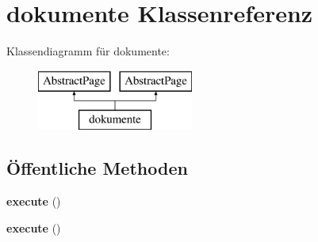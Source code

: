 \hypertarget{classdokumente}{}\section{dokumente Klassenreferenz}
\label{classdokumente}
Klassendiagramm für dokumente\+:\begin{figure}[H]
\begin{center}
\leavevmode
\includegraphics[height=2.000000cm]{classdokumente}
\end{center}
\end{figure}
\subsection*{Öffentliche Methoden}
\begin{DoxyCompactItemize}
\item 
\mbox{\label{classdokumente_aebf9dcf4eb2489342b2d286fc3f51dbc}} 
{\bfseries execute} ()
\item 
\mbox{\label{classdokumente_aebf9dcf4eb2489342b2d286fc3f51dbc}} 
{\bfseries execute} ()
\end{DoxyCompactItemize}
